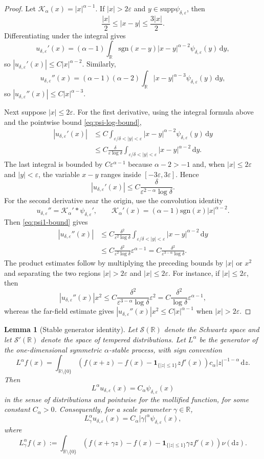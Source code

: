 \documentclass[10pt,a4paper]{amsart}
\newtheorem{lemma}[theorem]{Lemma}
\newcommand{\R}{\mathbb{R}}
\newcommand{\1}{\mathbf{1}}
\newcommand{\dd}{\,\mathrm{d}}
\newcommand{\md}{\mathrm{d}}
\newcommand{\eps}{\varepsilon}
\newcommand{\sgn}{\mathrm{sgn}}
\newcommand{\supp}{\mathrm{supp}}
\newcommand{\RieszK}{\mathcal K_\alpha}
\begin{document}
\begin{proof}
Let $\RieszK(x)=|x|^{\alpha-1}$. If $|x|>2\eps$ and $y\in\supp\psi_{\delta,\eps}$, then
\[
  \frac{|x|}{2}\le |x-y|\le \frac{3|x|}{2}.
\]
Differentiating under the integral gives
\[
  u_{\delta,\eps}'(x)=(\alpha-1)\int_\R \sgn(x-y)|x-y|^{\alpha-2}\psi_{\delta,\eps}(y)\dd y,
\]
so $|u_{\delta,\eps}'(x)|\le C|x|^{\alpha-2}$. Similarly,
\[
  u_{\delta,\eps}''(x)=(\alpha-1)(\alpha-2)\int_\R |x-y|^{\alpha-3}\psi_{\delta,\eps}(y)\dd y,
\]
so $|u_{\delta,\eps}''(x)|\le C|x|^{\alpha-3}$.

Next suppose $|x|\le2\eps$. For the first derivative, using the integral formula above and the pointwise bound \eqref{eq:psi-log-bound},
\begin{align*}
|u_{\delta,\eps}'(x)|
&\le C\int_{\eps/\delta<|y|<\eps}|x-y|^{\alpha-2}\psi_{\delta,\eps}(y)\dd y\\
&\le C\frac{\delta}{\eps\log\delta}
\int_{\eps/\delta<|y|<\eps}|x-y|^{\alpha-2}\dd y.
\end{align*}
The last integral is bounded by $C\eps^{\alpha-1}$ because $\alpha-2>-1$ and, when $|x|\le2\eps$ and $|y|<\eps$, the variable $x-y$ ranges inside $[-3\eps,3\eps]$. Hence
\[
|u_{\delta,\eps}'(x)|\le C\frac{\delta}{\eps^{2-\alpha}\log\delta}.
\]
For the second derivative near the origin, use the convolution identity
\[
  u_{\delta,\eps}''=\RieszK' * \psi_{\delta,\eps}',
  \qquad \RieszK'(x)=(\alpha-1)\sgn(x)|x|^{\alpha-2}.
\]
Then \eqref{eq:psi1-bound} gives
\begin{align*}
|u_{\delta,\eps}''(x)|
&\le C\frac{\delta^2}{\eps^2\log\delta}
\int_{\eps/\delta<|y|<\eps}|x-y|^{\alpha-2}\dd y\\
&\le C\frac{\delta^2}{\eps^2\log\delta}\eps^{\alpha-1}
= C\frac{\delta^2}{\eps^{3-\alpha}\log\delta}.
\end{align*}
The product estimates follow by multiplying the preceding bounds by $|x|$ or $x^2$ and separating the two regions $|x|>2\eps$ and $|x|\le2\eps$. For instance, if $|x|\le2\eps$, then
\[
  |u_{\delta,\eps}''(x)|x^2
  \le C\frac{\delta^2}{\eps^{3-\alpha}\log\delta}\eps^2
  =C\frac{\delta^2}{\log\delta}\eps^{\alpha-1},
\]
whereas the far-field estimate gives $|u_{\delta,\eps}''(x)|x^2\le C|x|^{\alpha-1}$ when $|x|>2\eps$.
\end{proof}


\begin{lemma}[Stable generator identity]\label{lem:stable-generator}
Let $\mathcal S(\R)$ denote the Schwartz space and let $\mathcal S'(\R)$ denote the space of tempered distributions. Let $L^\alpha$ be the generator of the one-dimensional symmetric $\alpha$-stable process, with sign convention
\[
L^\alpha f(x)=\int_{\R\setminus\{0\}}\left(f(x+z)-f(x)-\1_{\{|z|\le1\}}zf'(x)\right)c_\alpha |z|^{-1-\alpha}\dd z.
\]
Then
\[
  L^\alpha u_{\delta,\eps}(x)=C_\alpha\psi_{\delta,\eps}(x)
\]
in the sense of distributions and pointwise for the mollified function, for some constant $C_\alpha>0$. Consequently, for a scale parameter $\gamma\in\R$,
\[
  L^\alpha_\gamma u_{\delta,\eps}(x)=C_\alpha |\gamma|^\alpha\psi_{\delta,\eps}(x),
\]
where
\[
L^\alpha_\gamma f(x):=\int_{\R\setminus\{0\}}\left(f(x+\gamma z)-f(x)-\1_{\{|z|\le1\}}\gamma z f'(x)\right)\nu(\md z).
\]
\end{lemma}
\end{document}
